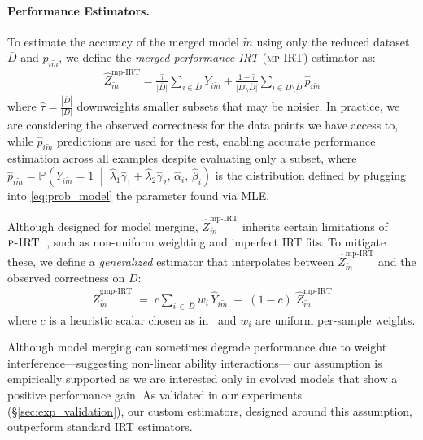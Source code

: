 \paragraph{Performance Estimators.}
To estimate the accuracy of the merged model $\tilde{m}$ using only the reduced dataset $\bar{D}$ and $p_{i\tilde{m}}$, we define the \emph{merged performance-IRT} (\textsc{mp-IRT}) estimator as:
\begin{align}
    \hat{Z}_{\tilde{m}}^{\mathrm{mp\text{-}IRT}}=
    \frac{\hat{\tau}}{\lvert \bar{D} \rvert} 
    \sum_{i \in \bar{D}} 
    Y_{i\tilde{m}}
    +
    \frac{1 - \hat{\tau}}{\lvert D \setminus \bar{D} \rvert} 
    \sum_{i \in D \setminus \bar{D}} 
    \hat{p}_{i\tilde{m}}
\end{align}
where ${\hat{\tau} = \frac{|\bar{D}|}{|D|}}$ downweights smaller subsets that may be noisier. In practice, we are considering the observed correctness for the data points we have access to, while $\hat{p}_{i\tilde{m}}$ predictions are used for the rest, enabling accurate performance estimation across all examples despite evaluating only a subset, where $\hat{p}_{i\tilde{m}} = \mathbb{P}\!\left( Y_{i\tilde{m}} = 1 \;\middle|\; \hat{\lambda}_1 \hat{\gamma}_{1} + \hat{\lambda}_2 \hat{\gamma}_{2}, \, \hat{\alpha}_i, \, \hat{\beta}_i \right)$ is the distribution defined by plugging into \cref{eq:prob_model} the parameter found via MLE. 

Although designed for model merging, \(\hat{Z}_{\tilde{m}}^{\mathrm{mp\text{-}IRT}}\) inherits certain limitations of \(\textsc{p-IRT}\)~\citep{tinybenchmarks}, such as non-uniform weighting and imperfect IRT fits. To mitigate these, we define a \emph{generalized} estimator that interpolates between \(\hat{Z}_{\tilde{m}}^{\mathrm{mp\text{-}IRT}}\) and the observed correctness on \(\bar{D}\):
%
\begin{align}\label{gp-irt}
    \hat{Z}_{\tilde{m}}^{\mathrm{gmp\text{-}IRT}}
    \;=\;
    c \sum_{i \,\in\, \bar{D}} w_i\,\hat{Y}_{i\tilde{m}}
    \;+\;
    (1 - c)\;\hat{Z}_{\tilde{m}}^{\mathrm{mp\text{-}IRT}} 
\end{align}
%
where \(c\) is a heuristic scalar chosen as in~\citet{tinybenchmarks} and \(w_i\) are uniform per-sample weights.

Although model merging can sometimes degrade performance due to weight interference—suggesting non-linear ability interactions— our assumption is empirically supported as we are interested only in evolved models that show a positive performance gain. As validated in our experiments (\S \ref{sec:exp_validation}), our custom estimators, designed around this assumption, outperform standard IRT estimators.


